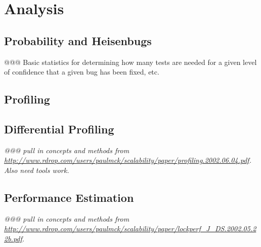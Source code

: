 
\chapter{Analysis}
\label{chp:Analysis}


\section{Probability and Heisenbugs}
\label{sec:analysis:Probability and Heisenbugs}

@@@ Basic statistics for determining how many tests are needed for a
given level of confidence that a given bug has been fixed, etc.

\section{Profiling}
\label{sec:analysis:Profiling}

\section{Differential Profiling}
\label{sec:analysis:Differential Profiling}

{\em @@@ pull in concepts and methods from
\url{http://www.rdrop.com/users/paulmck/scalability/paper/profiling.2002.06.04.pdf}.
Also need tools work.}

\section{Performance Estimation}
\label{sec:analysis:Performance Estimation}

{\em @@@ pull in concepts and methods from
\url{http://www.rdrop.com/users/paulmck/scalability/paper/lockperf_J_DS.2002.05.22b.pdf}.}
